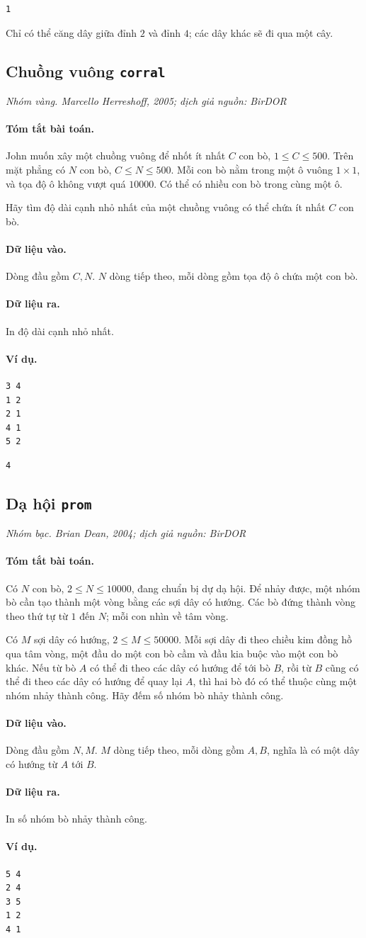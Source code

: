 \documentclass[11pt]{article}
\newcommand{\problem}[4]{%
  \subsection[#1 (#2)]{#1 \hfill {\normalsize\texttt{#2}}}%
  \noindent\textit{#3. #4}\par\smallskip
}
\newcommand{\iosec}[1]{\paragraph{#1}}
\begin{document}
\begin{verbatim}
1
\end{verbatim}

Chỉ có thể căng dây giữa đỉnh \(2\) và đỉnh \(4\); các dây khác sẽ đi qua
một cây.

\problem{Chuồng vuông}{corral}{Nhóm vàng}{Marcello Herreshoff, 2005; dịch giả nguồn: BirDOR}

\iosec{Tóm tắt bài toán.}
John muốn xây một chuồng vuông để nhốt ít nhất \(C\) con bò,
\(1\le C\le 500\). Trên mặt phẳng có \(N\) con bò, \(C\le N\le 500\). Mỗi con
bò nằm trong một ô vuông \(1\times 1\), và tọa độ ô không vượt quá \(10000\).
Có thể có nhiều con bò trong cùng một ô.

Hãy tìm độ dài cạnh nhỏ nhất của một chuồng vuông có thể chứa ít nhất \(C\)
con bò.

\iosec{Dữ liệu vào.}
Dòng đầu gồm \(C,N\). \(N\) dòng tiếp theo, mỗi dòng gồm tọa độ ô chứa một
con bò.

\iosec{Dữ liệu ra.}
In độ dài cạnh nhỏ nhất.

\iosec{Ví dụ.}
\begin{verbatim}
3 4
1 2
2 1
4 1
5 2
\end{verbatim}

\begin{verbatim}
4
\end{verbatim}

\problem{Dạ hội}{prom}{Nhóm bạc}{Brian Dean, 2004; dịch giả nguồn: BirDOR}

\iosec{Tóm tắt bài toán.}
Có \(N\) con bò, \(2\le N\le 10000\), đang chuẩn bị dự dạ hội. Để nhảy được,
một nhóm bò cần tạo thành một vòng bằng các sợi dây có hướng. Các bò đứng
thành vòng theo thứ tự từ \(1\) đến \(N\); mỗi con nhìn về tâm vòng.

Có \(M\) sợi dây có hướng, \(2\le M\le 50000\). Mỗi sợi dây đi theo chiều kim
đồng hồ qua tâm vòng, một đầu do một con bò cầm và đầu kia buộc vào một con
bò khác. Nếu từ bò \(A\) có thể đi theo các dây có hướng để tới bò \(B\), rồi
từ \(B\) cũng có thể đi theo các dây có hướng để quay lại \(A\), thì hai bò
đó có thể thuộc cùng một nhóm nhảy thành công. Hãy đếm số nhóm bò nhảy thành
công.

\iosec{Dữ liệu vào.}
Dòng đầu gồm \(N,M\). \(M\) dòng tiếp theo, mỗi dòng gồm \(A,B\), nghĩa là có
một dây có hướng từ \(A\) tới \(B\).

\iosec{Dữ liệu ra.}
In số nhóm bò nhảy thành công.

\iosec{Ví dụ.}
\begin{verbatim}
5 4
2 4
3 5
1 2
4 1
\end{verbatim}
\end{document}
